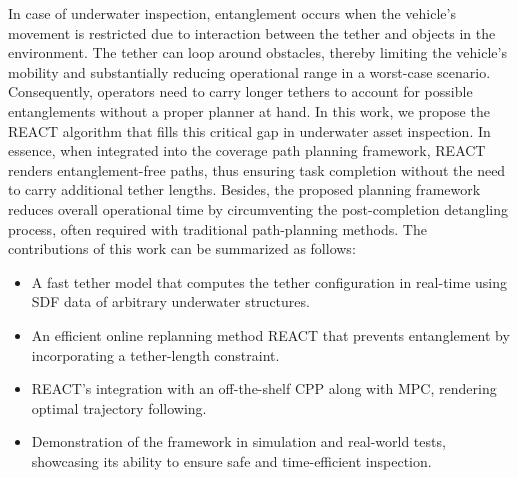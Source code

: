 %
%
In case of underwater inspection, entanglement occurs when the vehicle's movement is restricted due to interaction between the tether and objects in the environment. The tether can loop around obstacles, thereby limiting the vehicle's mobility and substantially reducing operational range in a worst-case scenario. Consequently, operators need to carry longer tethers to account for possible entanglements without a proper planner at hand.
In this work, we propose the \ac{REACT} algorithm that fills this critical gap in underwater asset inspection. In essence, when integrated into the coverage path planning framework, \ac{REACT} renders entanglement-free paths, thus ensuring task completion without the need to carry additional tether lengths. Besides, the proposed planning framework reduces overall operational time by circumventing the post-completion detangling process, often required with traditional path-planning methods. The contributions of this work can be summarized as follows:
\begin{itemize}
\item A fast tether model that computes the tether configuration in real-time using \ac{SDF} data of arbitrary underwater structures.
\item An efficient online replanning method \ac{REACT} that prevents entanglement by incorporating a tether-length constraint.
\item \ac{REACT}'s integration with an off-the-shelf \ac{CPP} along with \ac{MPC}, rendering optimal trajectory following.
\item Demonstration of the framework in simulation and real-world tests, showcasing its ability to ensure safe and time-efficient inspection.
\end{itemize}


